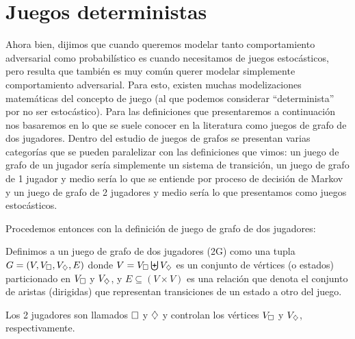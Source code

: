 





\section{Juegos deterministas}

Ahora bien, dijimos que cuando queremos modelar tanto comportamiento
adversarial como probabilístico es cuando necesitamos de juegos estocásticos,
pero resulta que también es muy común querer modelar simplemente comportamiento
adversarial. Para esto, existen muchas modelizaciones matemáticas del concepto
de juego (al que podemos considerar ``determinista'' por no ser estocástico).
Para las definiciones que presentaremos a continuación nos basaremos en lo que
se suele conocer en la literatura como juegos de grafo de dos jugadores. Dentro
del estudio de juegos de grafos se presentan varias categorías que se pueden
paralelizar con las definiciones que vimos: un juego de grafo de un jugador
sería simplemente un sistema de transición, un juego de grafo de 1 jugador y
medio sería lo que se entiende por proceso de decisión de Markov y un juego de
grafo de 2 jugadores y medio sería lo que presentamos como juegos estocásticos.

Procedemos entonces con la definición de juego de grafo de dos jugadores:

\begin{definition}
	Definimos a un juego de grafo de dos jugadores (2G) como una tupla $G = (V, V_\square,V_\diamondsuit, E)$ donde $V = V_\square \biguplus V_\diamondsuit$ es un conjunto de vértices (o estados) particionado en $V_\square$ y $V_\diamondsuit$, y $E \subseteq (V\times V)$ es una relación que denota el conjunto de aristas (dirigidas) que representan transiciones de un estado a otro del juego.

	Los 2 jugadores son llamados $\square$ y $\diamondsuit$ y controlan los vértices
	$V_\square$ y $V_\diamondsuit$, respectivamente.
\end{definition}

